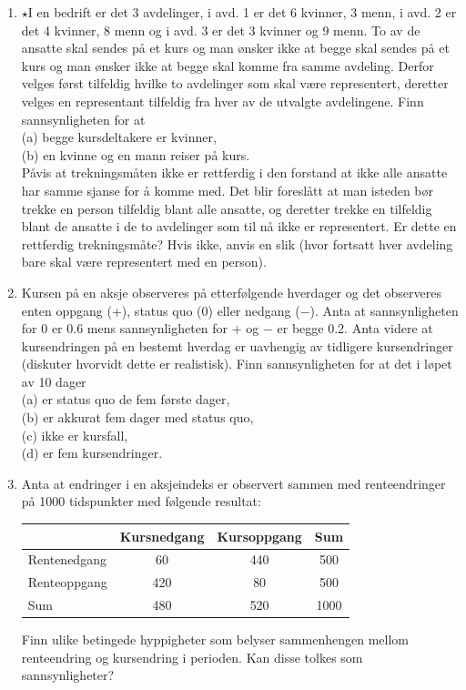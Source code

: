 \begin{enumerate}
\item  $\star$I en bedrift er det 3 avdelinger, i avd. 1 er det 6 kvinner,
     3 menn, i avd. 2 er det 4 kvinner, 8 menn og i avd. 3 er det
     3 kvinner og 9 menn. To av de ansatte skal sendes på et kurs
     og man ønsker ikke at begge skal sendes på et kurs og man
     ønsker ikke at begge skal komme fra samme avdeling. Derfor
     velges først tilfeldig hvilke to avdelinger som skal være
     representert, deretter velges en representant tilfeldig fra
     hver av de utvalgte avdelingene. Finn sannsynligheten for at \\
     (a)  begge kursdeltakere er kvinner,\\
     (b)  en kvinne og en mann reiser på kurs.\\
     Påvis at trekningsmåten ikke er rettferdig i den forstand at
     ikke alle ansatte har samme sjanse for å komme med. Det blir
     foreslått at man isteden bør trekke en person tilfeldig
     blant alle ansatte, og deretter trekke en tilfeldig blant de
     ansatte i de to avdelinger som til nå ikke er representert.
     Er dette en rettferdig trekningsmåte? Hvis ikke, anvis en
     slik (hvor fortsatt hver avdeling bare skal være
     representert med en person).

\item  Kursen på en aksje observeres på etterfølgende hverdager og
     det observeres enten oppgang (+), status quo (0) eller
     nedgang ($-$). Anta at sannsynligheten for 0 er 0.6 mens
     sannsynligheten for + og $-$ er begge 0.2. Anta videre at
     kursendringen på en bestemt hverdag er uavhengig av
     tidligere kursendringer (diskuter hvorvidt dette er
     realistisk). Finn sannsynligheten for at det i løpet av 10 dager \\
     (a)  er status quo de fem første dager,\\
     (b)  er akkurat fem dager med status quo,\\
     (c)  ikke er kursfall,\\
     (d)  er fem kursendringer.

\item Anta at endringer i en aksjeindeks er observert sammen med renteendringer
      på 1000 tidspunkter med følgende resultat:
\begin{center}
\begin{tabular}{l|cc|c}
             &Kursnedgang&Kursoppgang   &  Sum  \\ \hline
Rentenedgang &    60     &  440         &  500   \\
Renteoppgang &   420     &   80         &  500   \\ \hline
Sum        &     480     &  520         & 1000   \\ \hline
\end{tabular}
\end{center}
Finn ulike betingede hyppigheter som belyser sammenhengen mellom renteendring
og kursendring i perioden. Kan disse tolkes som sannsynligheter?


\end{enumerate}
